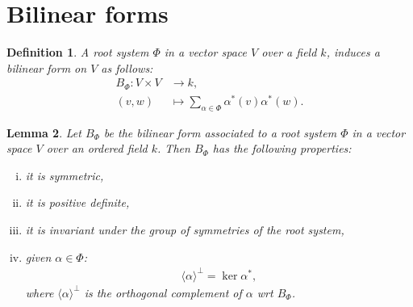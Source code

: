 \documentclass[12pt, a4paper]{article}
\newtheorem{lemma}{Lemma}[section]
\newtheorem{definition}[lemma]{Definition}
\begin{document}
\section{Bilinear forms}
\begin{definition}
  A root system $\Phi$ in a vector space $V$ over a field $k$, induces a bilinear form on $V$
  as follows:
  \begin{align*}
    B_\Phi : V \times V &\to k,\\
    (v, w) &\mapsto \sum_{\alpha \in \Phi}\alpha^*(v)\alpha^*(w).
  \end{align*}
\end{definition}

\begin{lemma}
  Let $B_\Phi$ be the bilinear form associated to a root system $\Phi$ in a vector space $V$ over an
  ordered field $k$. Then $B_\Phi$ has the following properties:
  \begin{enumerate}[(i)]
    \item it is symmetric\label{bilin_form_symm},
    \item it is positive definite\label{bilin_form_pos_def},
    \item it is invariant under the group of symmetries of the root system\label{bilin_form_invt},
    \item given $\alpha \in \Phi$:
    \begin{align*}
      \langle\alpha\rangle^{\perp} = \ker \alpha^*,
    \end{align*}
    where $\langle\alpha\rangle^{\perp}$ is the orthogonal complement of $\alpha$ wrt
    $B_\Phi$\label{bilin_form_othog_compl}.
  \end{enumerate}
\end{lemma}
\end{document}
